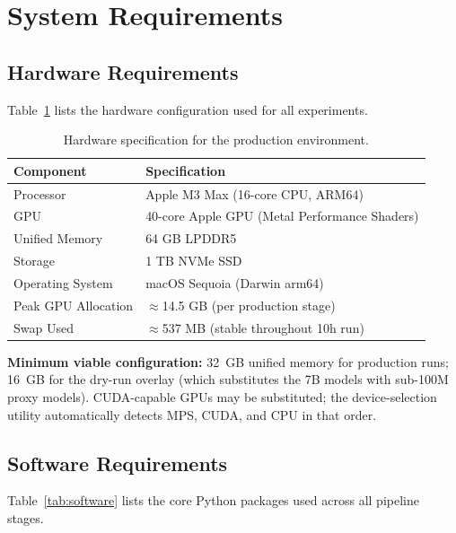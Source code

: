 \documentclass[12pt,a4paper]{article}
\begin{document}
\newpage
\section{System Requirements}
\label{sec:requirements}

\subsection{Hardware Requirements}

Table~\ref{tab:hardware} lists the hardware configuration used for all
experiments.

\begin{table}[H]
\centering
\caption{Hardware specification for the production environment.}
\label{tab:hardware}
\renewcommand{\arraystretch}{1.25}
\begin{tabular}{@{}ll@{}}
\toprule
\textbf{Component}   & \textbf{Specification} \\
\midrule
Processor            & Apple M3 Max (16-core CPU, ARM64) \\
GPU                  & 40-core Apple GPU (Metal Performance Shaders) \\
Unified Memory       & 64 GB LPDDR5 \\
Storage              & 1 TB NVMe SSD \\
Operating System     & macOS Sequoia (Darwin arm64) \\
Peak GPU Allocation  & $\approx$14.5 GB (per production stage) \\
Swap Used            & $\approx$537 MB (stable throughout 10h run) \\
\bottomrule
\end{tabular}
\end{table}

\textbf{Minimum viable configuration:} 32~GB unified memory for production
runs; 16~GB for the dry-run overlay (which substitutes the 7B models with
sub-100M proxy models). CUDA-capable GPUs may be substituted; the
device-selection utility automatically detects MPS, CUDA, and CPU in
that order.

\subsection{Software Requirements}

Table~\ref{tab:software} lists the core Python packages used across all
pipeline stages.
\end{document}
